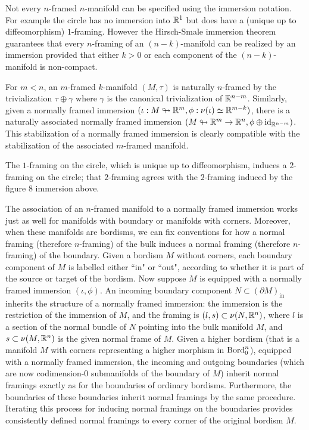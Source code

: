 \documentclass{amsart}
\begin{document}
\begin{remark}
Not every $n$-framed $n$-manifold can be specified using the immersion notation. For example the circle has no immersion into $\mathbb R^1$ but does have a (unique up to diffeomorphism) $1$-framing. However the Hirsch-Smale immersion theorem guarantees that every $n$-framing of an $(n-k)$-manifold can be realized by an immersion provided that either $k > 0$ or each component of the $(n-k)$-manifold is non-compact. 
\end{remark}

For $m < n$, an $m$-framed $k$-manifold $(M,\tau)$ is naturally $n$-framed by the trivialization $\tau \oplus \gamma$ where $\gamma$ is the canonical trivialization of $\mathbb R^{n-m}$.  Similarly, given a normally framed immersion $(\iota: M \looparrowright \mathbb R^m, \phi: \nu(\iota) \simeq \mathbb R^{m-k})$, there is a naturally associated normally framed immersion $(M \looparrowright \mathbb R^m \rightarrow \mathbb R^n, \phi \oplus \mathrm{id}_{\mathbb R^{n-m}})$.  This stabilization of a normally framed immersion is clearly compatible with the stabilization of the associated $m$-framed manifold.

\begin{example}
The $1$-framing on the circle, which is unique up to diffeomorphism, induces a $2$-framing on the circle; that $2$-framing agrees with the $2$-framing induced by the figure 8 immersion above. 
\end{example}

The association of an $n$-framed manifold to a normally framed immersion works just as well for manifolds with boundary or manifolds with corners.  Moreover, when these manifolds are bordisms, we can fix conventions for how a normal framing (therefore $n$-framing) of the bulk induces a normal framing (therefore $n$-framing) of the boundary.  Given a bordism $M$ without corners, each boundary component of $M$ is labelled either ``in" or ``out", according to whether it is part of the source or target of the bordism.  Now suppose $M$ is equipped with a normally framed immersion $(\iota,\phi)$.  An incoming boundary component $N \subset (\partial M)_{\textrm{in}}$ inherits the structure of a normally framed immersion: the immersion is the restriction of the immersion of $M$, and the framing is $(l, s) \subset \nu(N,\mathbb R^n)$, where $l$ is a section of the normal bundle of $N$ pointing into the bulk manifold $M$, and $s \subset \nu(M,\mathbb R^n)$ is the given normal frame of $M$.  Given a higher bordism (that is a manifold $M$ with corners representing a higher morphism in $\mathrm{Bord}_0^n$), equipped with a normally framed immersion, the incoming and outgoing boundaries (which are now codimension-0 submanifolds of the boundary of $M$) inherit normal framings exactly as for the boundaries of ordinary bordisms.  Furthermore, the boundaries of these boundaries inherit normal framings by the same procedure.  Iterating this process for inducing normal framings on the boundaries provides consistently defined normal framings to every corner of the original bordism $M$.
\end{document}
